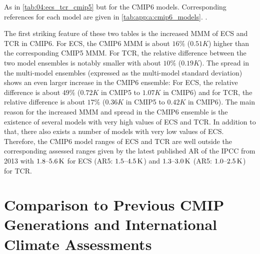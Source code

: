 \begin{table}[p]
  \centering
  \caption[
    As in \cref{tab:04:ecs_tcr_cmip5} but for the \acs{CMIP}6 models.
  ]{
    As in \cref{tab:04:ecs_tcr_cmip5} but for the \acs{CMIP}6 models.
    Corresponding references for each model are given in
    \cref{tab:app:a:cmip6_models}. .
  }
  \label{tab:04:ecs_tcr_cmip6}
\end{table}

The first striking feature of these two tables is the increased \ac{MMM} of
\ac{ECS} and \ac{TCR} in \acs{CMIP}6. For \ac{ECS}, the \acs{CMIP}6 \ac{MMM} is
about $16 \unit{\%}$ ($0.51 \unit{K}$) higher than the corresponding
\acs{CMIP}5 \ac{MMM}. For \ac{TCR}, the relative difference between the two
model ensembles is notably smaller with about $10 \unit{\%}$ ($0.19 \unit{K}$).
The spread in the multi-model ensembles (expressed as the multi-model standard
deviation) shows an even larger increase in the \acs{CMIP}6 ensemble: For
\ac{ECS}, the relative difference is about $49 \unit{\%}$ ($0.72 \unit{K}$ in
\acs{CMIP}5 to $1.07 \unit{K}$ in \acs{CMIP}6) and for \ac{TCR}, the relative
difference is about $17 \unit{\%}$ ($0.36 \unit{K}$ in \acs{CMIP}5 to $0.42
\unit{K}$ in \acs{CMIP}6). The main reason for the increased \ac{MMM} and
spread in the \acs{CMIP}6 ensemble is the existence of several models with very
high values of \ac{ECS} and \ac{TCR}. In addition to that, there also exists a
number of models with very low values of \ac{ECS}. Therefore, the \acs{CMIP}6
model ranges of \ac{ECS} and \ac{TCR} are well outside the corresponding
assessed ranges given by the latest published \ac{AR} of the \ac{IPCC} from
2013 \autocite{Stocker2013} with $\rangeunit{1.8}{5.6}{K}$ for \ac{ECS}
(\acs{AR}5: $\rangeunit{1.5}{4.5}{K}$) and $\rangeunit{1.3}{3.0}{K}$
(\acs{AR}5: $\rangeunit{1.0}{2.5}{K}$) for \ac{TCR}.


\section{Comparison to Previous \acs{CMIP} Generations and International
  Climate Assessments}
\label{sec:04:historical_context}

